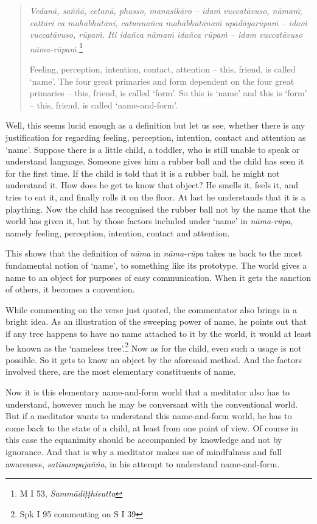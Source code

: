 \clearpage

\begin{quote}
\emph{Vedanā, saññā, cetanā, phasso, manasikāro -- idaṁ vuccatāvuso, nāmaṁ}; \emph{cattāri ca mahābhūtāni, catunnañca mahābhūtānaṁ upādāyarūpaṁ -- idaṁ vuccatāvuso, rūpaṁ. Iti idañca nāmaṁ idañca rūpaṁ -- idam vuccatāvuso nāma-rūpaṁ.}\footnote{M I 53, \emph{Sammādiṭṭhisutta}}

Feeling, perception, intention, contact, attention -- this, friend, is called `name'. The four great primaries and form dependent on the four great primaries -- this, friend, is called `form'. So this is `name' and this is `form' -- this, friend, is called `name-and-form'.
\end{quote}

Well, this seems lucid enough as a definition but let us see, whether there is any justification for regarding feeling, perception, intention, contact and attention as `name'. Suppose there is a little child, a toddler, who is still unable to speak or understand language. Someone gives him a rubber ball and the child has seen it for the first time. If the child is told that it is a rubber ball, he might not understand it. How does he get to know that object? He smells it, feels it, and tries to eat it, and finally rolls it on the floor. At last he understands that it is a plaything. Now the child has recognised the rubber ball not by the name that the world has given it, but by those factors included under `name' in \emph{nāma-rūpa}, namely feeling, perception, intention, contact and attention.

This shows that the definition of \emph{nāma} in \emph{nāma-rūpa} takes us back to the most fundamental notion of `name', to something like its prototype. The world gives a name to an object for purposes of easy communication. When it gets the sanction of others, it becomes a convention.

While commenting on the verse just quoted, the commentator also brings in a bright idea. As an illustration of the sweeping power of name, he points out that if any tree happens to have no name attached to it by the world, it would at least be known as the `nameless tree'.\footnote{Spk I 95 commenting on S I 39} Now as for the child, even such a usage is not possible. So it gets to know an object by the aforesaid method. And the factors involved there, are the most elementary constituents of name.

Now it is this elementary name-and-form world that a meditator also has to understand, however much he may be conversant with the conventional world. But if a meditator wants to understand this name-and-form world, he has to come back to the state of a child, at least from one point of view. Of course in this case the equanimity should be accompanied by knowledge and not by ignorance. And that is why a meditator makes use of mindfulness and full awareness, \emph{satisampajañña}, in his attempt to understand name-and-form.

